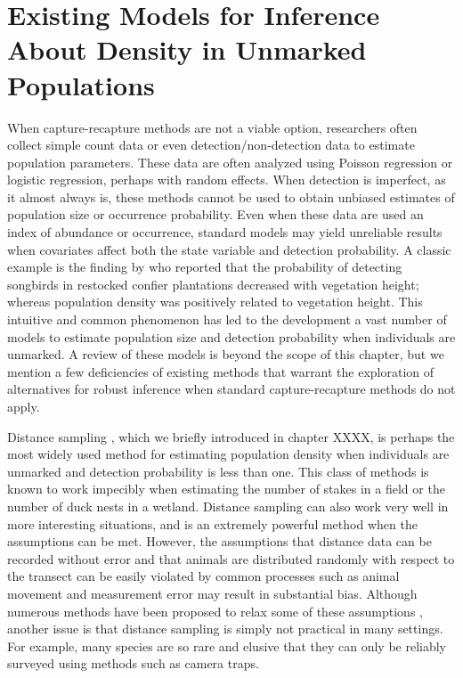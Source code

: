 \section{Existing Models for Inference About Density in Unmarked Populations}
\label{Sect.existing-unmarked}

When capture-recapture methods are not a viable option, researchers
often collect simple count data or even detection/non-detection data
to estimate population parameters. These data are often analyzed using
Poisson regression or logistic regression, perhaps with random
effects. When detection is imperfect, as it almost always is,
these methods cannot be used to obtain unbiased estimates of
population size or occurrence probability. Even when these data are
used an index of abundance or occurrence, standard models may yield
unreliable results when covariates affect both the state variable and
detection probability. A classic example is the finding by
\citet{bibby_buckland:1987} who reported that the probability of detecting
songbirds in restocked confier plantations decreased with vegetation
height; whereas population density was positively related to
vegetation height. This intuitive and common phenomenon has led to the
development a vast number of models to estimate population size and
detection probability when individuals are unmarked. A review of these
models is beyond the scope of this
chapter, but we mention a few deficiencies of existing methods
that warrant the exploration of alternatives for robust inference when
standard capture-recapture methods do not apply.

Distance sampling \citep{buckland_etal:2001}, which we briefly introduced in chapter XXXX,
is perhaps the most widely used method for
estimating population density when individuals are unmarked and
detection probability is less than one. This class of methods is known
to work impecibly when estimating the number of stakes in a field or
the number of duck nests in a wetland.
Distance sampling can also work very well in
more interesting situations, and is an extremely powerful method when
the assumptions can be met. However, the assumptions that distance
data can be recorded without error and that animals are distributed
randomly with respect to the transect can be easily violated by
common processes such as animal movement and measurement error may result in
substantial bias. Although numerous methods have been proposed to
relax some of these assumptions
\citet{royle_etal:2004,borchers_etal:1998,johnson_etal:2010,chandler_etal:2011},
another issue is that distance
sampling is simply not practical in many settings. For example, many
species are so rare and elusive that they can only be reliably
surveyed using methods such as camera traps.

